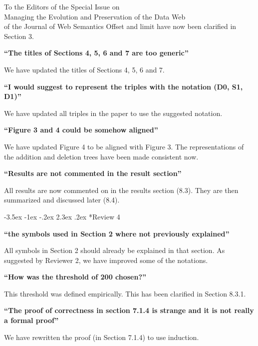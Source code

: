 \documentclass{letter}
\makeatletter
\newcounter{section}
\newcommand\section{\@startsection {section}{1}{\z@}%
                                   {-3.5ex \@plus -1ex \@minus -.2ex}%
                                   {2.3ex \@plus.2ex}%
                                   {\normalfont\Large\bfseries}}
\makeatother
\begin{document}
\begin{letter}{To the Editors of the Special Issue on\\Managing the Evolution and Preservation of the Data Web\\of the Journal of Web Semantics}
Offset and limit have now been clarified in Section 3.

\textbf{\enquote{The titles of Sections 4, 5, 6 and 7 are too generic}}

We have updated the titles of Sections 4, 5, 6 and 7.

\textbf{\enquote{I would suggest to represent the triples with the notation (D0, S1, D1)}}

We have updated all triples in the paper to use the suggested notation.

\textbf{\enquote{Figure 3 and 4 could be somehow aligned}}

We have updated Figure 4 to be aligned with Figure 3.
The representations of the addition and deletion trees have been made consistent now.

\textbf{\enquote{Results are not commented in the result section}}

All results are now commented on in the results section (8.3).
They are then summarized and discussed later (8.4).

\section*{Review 4}

\textbf{\enquote{the symbols used in Section 2 where not previously explained}}

All symbols in Section 2 should already be explained in that section.
As suggested by Reviewer 2, we have improved some of the notations.

\textbf{\enquote{How was the threshold of 200 chosen?}}

This threshold was defined empirically.
This has been clarified in Section 8.3.1.

\textbf{\enquote{The proof of correctness in section 7.1.4 is strange and it is not really a formal proof}}

We have rewritten the proof (in Section 7.1.4) to use induction.

\end{letter}
\end{document}
